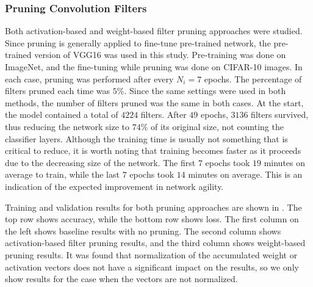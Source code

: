 \documentclass{article}
\begin{document}
\subsubsection{Pruning Convolution Filters} \label{PruneFilterRes}

Both activation-based and weight-based filter pruning approaches were studied. Since pruning is generally applied to fine-tune pre-trained network, the pre-trained version of VGG16 was used in this study. Pre-training was done on ImageNet, and the fine-tuning while pruning was done on CIFAR-10 images. In each case, pruning was performed after every $N_i = 7$ epochs. The percentage of filters pruned each time was $5$\%. Since the same settings were used in both methods, the number of filters pruned was the same in both cases. At the start, the model contained a total of $4224$ filters. After $49$ epochs, $3136$ filters survived, thus reducing the network size to $74$\% of its original size, not counting the classifier layers. Although the training time is usually not something that is critical to reduce, it is worth noting that training becomes faster as it proceeds due to the decreasing size of the network. The first $7$ epochs took $19$ minutes on average to train, while the last $7$ epochs took $14$ minutes on average. This is an indication of the expected improvement in network agility.

Training and validation results for both pruning approaches are shown in . The top row shows accuracy, while the bottom row shows loss. The first column on the left shows baseline results with no pruning. The second column shows activation-based filter pruning results, and the third column shows weight-based pruning results. It was found that normalization of the accumulated weight or activation vectors does not have a significant impact on the results, so we only show results for the case when the vectors are not normalized.
\end{document}
